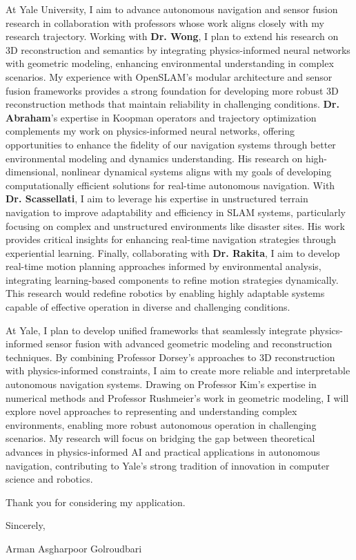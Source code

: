 \documentclass[a4,20pt]{article}
\begin{document}
\begin{large}
At Yale University, I aim to advance autonomous navigation and sensor fusion research in collaboration with professors whose work aligns closely with my research trajectory. Working with \textbf{Dr. Wong}, I plan to extend his research on 3D reconstruction and semantics by integrating physics-informed neural networks with geometric modeling, enhancing environmental understanding in complex scenarios. My experience with OpenSLAM's modular architecture and sensor fusion frameworks provides a strong foundation for developing more robust 3D reconstruction methods that maintain reliability in challenging conditions. \textbf{Dr. Abraham}'s expertise in Koopman operators and trajectory optimization complements my work on physics-informed neural networks, offering opportunities to enhance the fidelity of our navigation systems through better environmental modeling and dynamics understanding. His research on high-dimensional, nonlinear dynamical systems aligns with my goals of developing computationally efficient solutions for real-time autonomous navigation. With \textbf{Dr. Scassellati}, I aim to leverage his expertise in unstructured terrain navigation to improve adaptability and efficiency in SLAM systems, particularly focusing on complex and unstructured environments like disaster sites. His work provides critical insights for enhancing real-time navigation strategies through experiential learning. Finally, collaborating with \textbf{Dr. Rakita}, I aim to develop real-time motion planning approaches informed by environmental analysis, integrating learning-based components to refine motion strategies dynamically. This research would redefine robotics by enabling highly adaptable systems capable of effective operation in diverse and challenging conditions.






At Yale, I plan to develop unified frameworks that seamlessly integrate physics-informed sensor fusion with advanced geometric modeling and reconstruction techniques. By combining Professor Dorsey's approaches to 3D reconstruction with physics-informed constraints, I aim to create more reliable and interpretable autonomous navigation systems. Drawing on Professor Kim's expertise in numerical methods and Professor Rushmeier's work in geometric modeling, I will explore novel approaches to representing and understanding complex environments, enabling more robust autonomous operation in challenging scenarios. My research will focus on bridging the gap between theoretical advances in physics-informed AI and practical applications in autonomous navigation, contributing to Yale's strong tradition of innovation in computer science and robotics.

\vspace{0.15cm}
Thank you for considering my application.\vspace{-0.1cm}

Sincerely, \vspace{-0.1cm}

Arman Asgharpoor Golroudbari


\end{large}
\small


\end{document}
